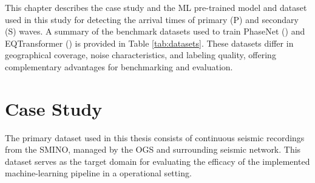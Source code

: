 \label{chap:Datasets}
This chapter describes the case study and the \ac{ML} pre-trained model and
dataset used in this study for detecting the arrival times of primary (P) and
secondary (S) waves. A summary of the benchmark datasets used to train PhaseNet
(\cite{PhaseNet}) and EQTransformer (\cite{EQTransformer}) is provided in Table
\ref{tab:datasets}. These datasets differ in geographical coverage, noise
characteristics, and labeling quality, offering complementary advantages for
benchmarking and evaluation.

\section{Case Study}
\label{sec:case_study}

The primary dataset used in this thesis consists of continuous seismic
recordings from the \ac{SMINO}, managed by the \ac{OGS} and surrounding
seismic network. This dataset serves as the target domain for evaluating the
efficacy of the implemented machine-learning pipeline in a operational setting.

